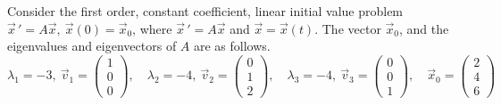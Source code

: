 \ifnum {}
\question[10] Consider the first order, constant coefficient, linear initial value problem $\vec x \, ' = A\vec x, \ \vec x (0) = \vec x_0$, where $\vec x \, ' = A\vec x$ and $\vec x = \vec x(t)$. The vector $\vec x_0$, and the eigenvalues and eigenvectors of $A$ are as follows. 
$$\lambda_1 = -3, \ \vec v_1 = \begin{pmatrix}1\\0\\0 \end{pmatrix} , \quad \lambda_2 = -4, \ \vec v_2 = \begin{pmatrix} 0\\1\\2 \end{pmatrix}, \quad \lambda_3 = -4, \ \vec v_3 = \begin{pmatrix} 0\\0\\1\end{pmatrix}, \quad \vec x_0 = \begin{pmatrix} 2\\4\\6\end{pmatrix}$$
\fi







